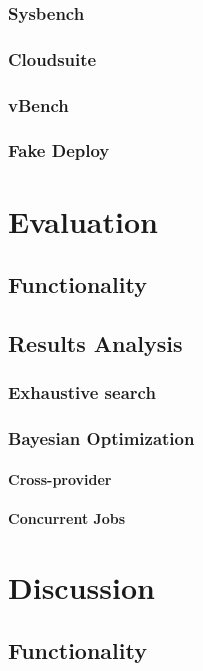 \documentclass{report}
\begin{document}
\subsection{Sysbench}
\subsection{Cloudsuite}
\subsection{vBench}
\subsection{Fake Deploy}
\chapter{Evaluation}
\section{Functionality}
\section{Results Analysis}
\subsection{Exhaustive search}
\subsection{Bayesian Optimization}
\subsubsection{Cross-provider}
\subsubsection{Concurrent Jobs}
\chapter{Discussion}
\section{Functionality}
\end{document}
